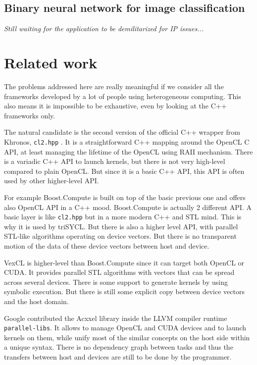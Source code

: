 \documentclass[sigplan, review]{acmart}
\begin{document}
\subsection{Binary neural network for image classification}
\label{sec:example-from-ken}

\emph{Still waiting for the application to be demilitarized for IP issues...}


\section{Related work}
\label{sec:related-work}

The problems addressed here are really meaningful if we consider all
the frameworks developed by a lot of people using heterogeneous
computing. This also means it is impossible to be exhaustive, even by
looking at the C++ frameworks only.

The natural candidate is the second version of the official C++
wrapper from Khronos, \texttt{cl2.hpp} \cite{cl2.hpp}. It is a
straightforward C++ mapping around the OpenCL C API, at least managing
the lifetime of the OpenCL using RAII mechanism. There is a variadic
C++ API to launch kernels, but there is not very high-level compared
to plain OpenCL. But since it is a basic C++ API, this API is often
used by other higher-level API.

For example Boost.Compute \cite{Boost.Compute} is built on top of the
basic previous one and offers also OpenCL API in a C++ mood.
Boost.Compute is actually 2 different API. A basic layer is like
\texttt{cl2.hpp} but in a more modern C++ and STL mind. This is why it
is used by triSYCL. But there is also a higher level API, with
parallel STL-like algorithms operating on device vectors. But there is
no transparent motion of the data of these device vectors between host
and device.

VexCL \cite{VexCL} is higher-level than Boost.Compute since it can
target both OpenCL or CUDA. It provides parallel STL algorithms with
vectors that can be spread across several devices. There is some
support to generate kernels by using symbolic execution. But there is
still some explicit copy between device vectors and the host domain.

Google contributed the Acxxel library \cite{Acxxel-4.0} inside the
LLVM compiler runtime \texttt{parallel-libs}. It allows to manage
OpenCL and CUDA devices and to launch kernels on them, while unify
most of the similar concepts on the host side within a unique
syntax. There is no dependency graph between tasks and thus the
transfers between host and devices are still to be done by the
programmer.
\end{document}
